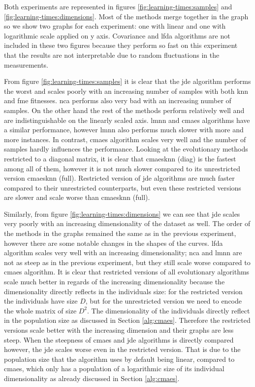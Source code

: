 \documentclass[12pt,a4paper]{report}
\begin{document}
Both experiments are represented in figures \ref{fig:learning-times:samples} and \ref{fig:learning-times:dimensions}. Most of the methods merge together in the graph so we show two graphs for each experiment: one with linear and one with logarithmic scale applied on y axis. Covariance and \ac{lfda} algorithms are not included in these two figures because they perform so fast on this experiment that the results are not interpretable due to random fluctuations in the measurements.

From figure \ref{fig:learning-times:samples} it is clear that the \ac{jde} algorithm performs the worst and scales poorly with an increasing number of samples with both \ac{knn} and \ac{fme} fitnesses. \ac{nca} performs also very bad with an increasing number of samples. On the other hand the rest of the methods perform relatively well and are indistinguishable on the linearly scaled axis. \ac{lmnn} and \ac{cmaes} algorithms have a similar performance, however \ac{lmnn} also performs much slower with more and more instances. In contrast, \ac{cmaes} algorithm scales very well and the number of samples hardly influences the performance. Looking at the evolutionary methods restricted to a diagonal matrix, it is clear that \ac{cmaesknn} (diag) is the fastest among all of them, however it is not much slower compared to its unrestricted version \ac{cmaesknn} (full). Restricted version of \ac{jde} algorithms are much faster compared to their unrestricted counterparts, but even these restricted versions are slower and scale worse than \ac{cmaesknn} (full).


Similarly, from figure \ref{fig:learning-times:dimensions} we can see that \ac{jde} scales very poorly with an increasing dimensionality of the dataset as well. The order of the methods in the graphs remained the same as in the previous experiment, however there are some notable changes in the shapes of the curves. \ac{lfda} algorithm scales very well with an increasing dimensionality; \ac{nca} and \ac{lmnn} are not as steep as in the previous experiment, but they still scale worse compared to \ac{cmaes} algorithm. It is clear that restricted versions of all evolutionary algorithms scale much better in regards of the increasing dimensionality because the dimensionality directly reflects in the individuals size: for the restricted version the individuals have size $D$, but for the unrestricted version we need to encode the whole matrix of size $D^2$. The dimensionality of the individuals directly reflect in the population size as discussed in Section \ref{alg:cmaes}. Therefore the restricted versions scale better with the increasing dimension and their graphs are less steep. When the steepness of \ac{cmaes} and \ac{jde} algorithms is directly compared however, the \ac{jde} scales worse even in the restricted version. That is due to the population size that the algorithm uses by default being linear, compared to \ac{cmaes}, which only has a population of a logarithmic size of its individual dimensionality as already discussed in Section \ref{alg:cmaes}.
\end{document}

